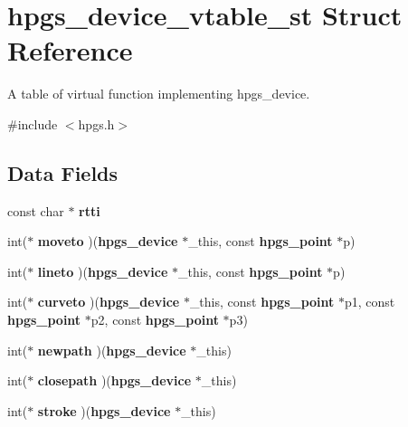 \section{hpgs\_\-device\_\-vtable\_\-st Struct Reference}
\label{structhpgs__device__vtable__st}


A table of virtual function implementing {\ttfamily hpgs\_\-device}.  




{\ttfamily \#include $<$hpgs.h$>$}

\subsection*{Data Fields}
\begin{DoxyCompactItemize}
\item 
const char $\ast$ {\bfseries rtti}\label{structhpgs__device__vtable__st_a59095283a999512ac8edfc1e9008c4e1}

\item 
int($\ast$ {\bfseries moveto} )({\bf hpgs\_\-device} $\ast$\_\-this, const {\bf hpgs\_\-point} $\ast$p)\label{structhpgs__device__vtable__st_a287a5215d8597c643d41ac771e1bc15c}

\item 
int($\ast$ {\bfseries lineto} )({\bf hpgs\_\-device} $\ast$\_\-this, const {\bf hpgs\_\-point} $\ast$p)\label{structhpgs__device__vtable__st_af6cb3fa9fed286a18632631fc8c4ee1f}

\item 
int($\ast$ {\bfseries curveto} )({\bf hpgs\_\-device} $\ast$\_\-this, const {\bf hpgs\_\-point} $\ast$p1, const {\bf hpgs\_\-point} $\ast$p2, const {\bf hpgs\_\-point} $\ast$p3)\label{structhpgs__device__vtable__st_a5581e1c0473f9b748466c1bf38fdb4b0}

\item 
int($\ast$ {\bfseries newpath} )({\bf hpgs\_\-device} $\ast$\_\-this)\label{structhpgs__device__vtable__st_a5781cdaec70e07b2fbe42759878c4a12}

\item 
int($\ast$ {\bfseries closepath} )({\bf hpgs\_\-device} $\ast$\_\-this)\label{structhpgs__device__vtable__st_af6d07ac482acfa3ae42fb2720d6125f5}

\item 
int($\ast$ {\bfseries stroke} )({\bf hpgs\_\-device} $\ast$\_\-this)\label{structhpgs__device__vtable__st_a69685e71952f8df6987aaf99fe266fce}


\end{DoxyCompactItemize}
